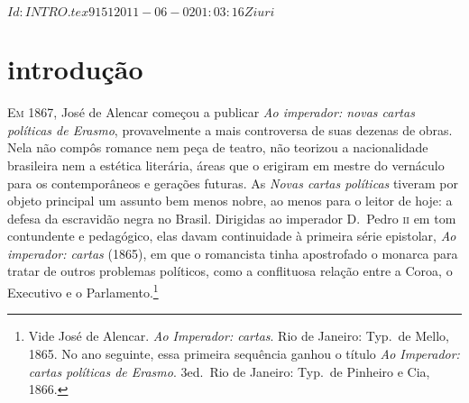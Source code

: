 \SVN $Id: INTRO.tex 9151 2011-06-02 01:03:16Z iuri $


\chapter[Introdução, por Tâmis Parron]{introdução}

\noindent\textsc{Em 1867,} José de Alencar começou a publicar \textit{Ao imperador: novas
cartas políticas de Erasmo}, provavelmente a mais controversa de suas
dezenas de obras. Nela não compôs romance nem peça de teatro, não
teorizou a nacionalidade brasileira nem a estética literária, áreas que
o erigiram em mestre do vernáculo para os contemporâneos e gerações
futuras. As \textit{Novas cartas políticas} tiveram por objeto
principal um assunto bem menos nobre, ao menos para o leitor de hoje: a
defesa da escravidão negra no Brasil. Dirigidas ao imperador D.~Pedro
\textsc{ii} em tom contundente e pedagógico, elas davam continuidade à primeira
série epistolar, \textit{Ao imperador: cartas} (1865), em que o
romancista tinha apostrofado o monarca para tratar de outros problemas
políticos, como a conflituosa relação entre a Coroa, o Executivo e o
Parlamento.\footnote{ Vide José de Alencar. \textit{Ao Imperador:
cartas}. Rio de Janeiro: Typ.~de Mello, 1865. No ano seguinte, essa
primeira sequência ganhou o título \textit{Ao Imperador: cartas
políticas de Erasmo}. 3\ai ed.~Rio de Janeiro: Typ.~de Pinheiro e Cia, 1866.} 

